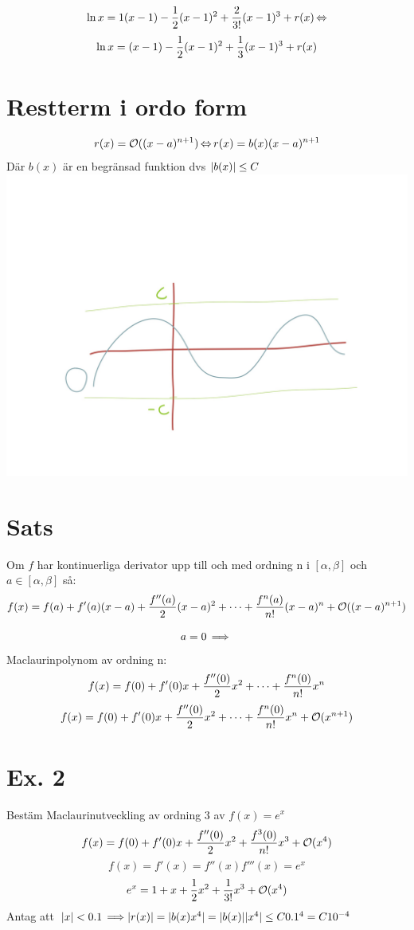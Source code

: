 \documentclass{article}
\newcommand{\Or}{{\mathcal{O}}}
\begin{document}
  $$ \ln x = 1(x-1) - \frac{1}{2} (x-1)^2 + \frac{2}{3!}(x-1)^3 + r(x) \operatorname{\Leftrightarrow} $$
  $$ \ln x = (x-1) - \frac{1}{2} (x-1)^2 + \frac{1}{3}(x-1)^3 + r(x) $$


  \section{Restterm i ordo form}
  $$ r(x) = \Or((x-a)^{n+1}) \eq r(x) = b(x)(x-a)^{n+1} $$
  Där $b(x)$ är en begränsad funktion dvs $ \lvert b(x)\rvert \le C $\\
  \includegraphics[scale=0.20]{img/img2.jpg}\\

  \section{Sats}
  Om $f$ har kontinuerliga derivator upp till och med ordning n i $[\alpha, \beta]$ och $a\in [\alpha, \beta]$ så:
  $$ f(x) = f(a) + f'(a)(x-a) + \f{f''(a)}2(x-a)^2+\dots+\f{f^{n}(a)}{n!}(x-a)^n + \Or((x-a)^{n+1})$$

  $$a=0\operatorname{\implies}$$
  Maclaurinpolynom av ordning n:
  $$ f(x) = f(0) + f'(0)x + \frac{f''(0)}{2}x^2+\dots+\frac{f^{n}(0)}{n!}x^n$$
  $$ f(x) = f(0) + f'(0)x + \f{f''(0)}2x^2+\dots+\f{f^{n}(0)}{n!}x^n + \Or(x^{n+1})$$

  \section{Ex. 2}
  Bestäm Maclaurinutveckling av ordning 3 av $f(x)=e^x$
  $$ f(x) = f(0) + f'(0)x + \f{f''(0)}2x^2+\f{f^{3}(0)}{n!}x^3 + \Or(x^4)$$
  $$ f(x) = f'(x) = f''(x) f'''(x) = e^x$$
  $$ e^x=1+x+\f 12 x^2 + \f 1{3!}x^3 + \Or(x^4) $$
  Antag att $ \lvert x\rvert<0.1 \operatorname{\implies} \lvert r(x)\rvert = \lvert b(x)x^4\rvert= \lvert b(x)\rvert\lvert x^4\rvert \le C 0.1^4 = C 10^{-4}  $
\end{document}
